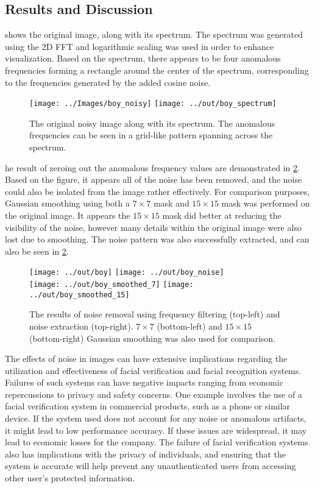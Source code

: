 \documentclass[headings=optiontoheadandtoc,listof=totoc,parskip=full]{scrartcl}
\begin{document}
\subsection{Results and Discussion}

 shows the original image, along with its spectrum. The spectrum was generated using the 2D FFT and logarithmic scaling was used in order to enhance visualization. Based on the spectrum, there appears to be four anomalous frequencies forming a rectangle around the center of the spectrum, corresponding to the frequencies generated by the added cosine noise. 

\begin{figure}[H]
	\centering
	\texttt{[image: ../Images/boy\_noisy]}
	\texttt{[image: ../out/boy\_spectrum]}
	\caption{The original noisy image along with its spectrum. The anomalous frequencies can be seen in a grid-like pattern spanning across the spectrum.}
	\label{fig:boyNoisy}
\end{figure}

he result of zeroing out the anomalous frequency values are demonstrated in \cref{fig:boy}. Based on the figure, it appears all of the noise has been removed, and the noise could also be isolated from the image rather effectively. For comparison purposes, Gaussian smoothing using both a $7 \times 7$ mask and $15 \times 15$ mask was performed on the original image. It appears the $15 \times 15$ mask did better at reducing the visibility of the noise, however many details within the original image were also lost due to smoothing. The noise pattern was also successfully extracted, and can also be seen in \cref{fig:boy}.

\begin{figure}[H]
	\centering
	\texttt{[image: ../out/boy]}
	\texttt{[image: ../out/boy\_noise]} \\
	\texttt{[image: ../out/boy\_smoothed\_7]}
	\texttt{[image: ../out/boy\_smoothed\_15]}
	\caption{The results of noise removal using frequency filtering (top-left) and noise extraction (top-right). $7 \times 7$ (bottom-left) and $15 \times 15$ (bottom-right) Gaussian smoothing was also used for comparison.}
	\label{fig:boy}
\end{figure}

The effects of noise in images can have extensive implications regarding the utilization and effectiveness of facial verification and facial recognition systems. Failures of such systems can have negative impacts ranging from economic repercussions to privacy and safety concerns. One example involves the use of a facial verification system in commercial products, such as a phone or similar device. If the system used does not account for any noise or anomalous artifacts, it might lead to low performance accuracy. If these issues are widespread, it may lead to economic losses for the company. The failure of facial verification systems also has implications with the privacy of individuals, and ensuring that the system is accurate will help prevent any unauthenticated users from accessing other user’s protected information.
\end{document}
